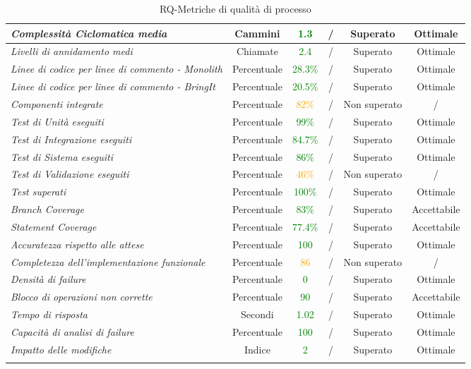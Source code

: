 \begin{longtable}{|>{\centering}m{5cm}|c|c|c|c|c|}
\emph{Complessità Ciclomatica media} & {Cammini} & \textcolor{Green}{1.3} & / & Superato & Ottimale\\ \hline
\emph{Livelli di annidamento medi} & {Chiamate} & \textcolor{Green}{2.4} & / & Superato & Ottimale\\ \hline
\emph{Linee di codice per linee di commento - Monolith} & {Percentuale} & \textcolor{Green}{28.3\%} & / & Superato & Ottimale\\ \hline
\emph{Linee di codice per linee di commento - BringIt} & {Percentuale} & \textcolor{Green}{20.5\%} & / & Superato & Ottimale\\ \hline
\emph{Componenti integrate} & {Percentuale} & \textcolor{Orange}{82\%} & / & Non superato & /\\ \hline
\emph{Test di Unità eseguiti} & {Percentuale} & \textcolor{Green}{99\%} & / & Superato & Ottimale\\ \hline
\emph{Test di Integrazione eseguiti} & {Percentuale} & \textcolor{Green}{84.7\%} & / & Superato & Ottimale\\ \hline
\emph{Test di Sistema eseguiti} & {Percentuale} & \textcolor{Green}{86\%} & / & Superato & Ottimale\\ \hline
\emph{Test di Validazione eseguiti} & {Percentuale} & \textcolor{Orange}{46\%} & / & Non superato & / \\ \hline
\emph{Test superati} & {Percentuale} & \textcolor{Green}{100\%} & / & Superato & Ottimale \\ \hline
\emph{Branch Coverage} & {Percentuale} & \textcolor{Green}{83\%} & / & Superato & Accettabile\\ \hline
\emph{Statement Coverage} & {Percentuale} & \textcolor{Green}{77.4\%} & / & Superato & Accettabile\\ \hline
\emph{Accuratezza rispetto alle attese} & {Percentuale} & \textcolor{Green}{100} & / & Superato & Ottimale\\ \hline
\emph{Completezza dell’implementazione funzionale} & {Percentuale} & \textcolor{Orange}{86} & / & Non superato & /\\ \hline
\emph{Densità di failure} & {Percentuale} & \textcolor{Green}{0} & / & Superato & Ottimale\\ \hline
\emph{Blocco di operazioni non corrette} & {Percentuale} & \textcolor{Green}{90} & / & Superato & Accettabile\\ \hline
\emph{Tempo di risposta} & {Secondi} & \textcolor{Green}{1.02} & / & Superato & Ottimale\\ \hline
\emph{Capacità di analisi di failure} & {Percentuale} & \textcolor{Green}{100} & / & Superato & Ottimale\\ \hline
\emph{Impatto delle modifiche} & {Indice} & \textcolor{Green}{2} & / & Superato & Ottimale\\ \hline
\caption{RQ-Metriche di qualità di processo}\\
\end{longtable}

